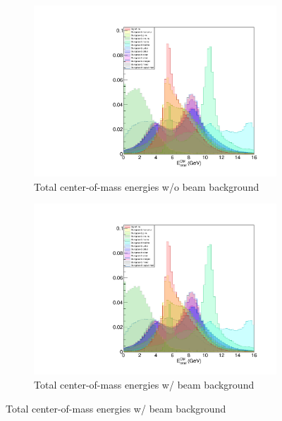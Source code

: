 \documentclass[12pt]{thesis}  %
\begin{document}
   \begin{figure}[h]
        \centering
        \begin{subfigure}[b]{0.475\textwidth}
            \centering
            \includegraphics[width=\textwidth]{images/test.pdf}
            \caption[Network2]%
            {{\small Total center-of-mass energies w/o beam background}}    
            \label{fig:mean and std of net14}
        \end{subfigure}
        \hfill
        \begin{subfigure}[b]{0.475\textwidth}  
            \centering 
            \includegraphics[width=\textwidth]{images/test.pdf}
            \caption[]%
            {{\small Total center-of-mass energies w/ beam background}}    
            \label{fig:mean and std of net24}
        \end{subfigure}
    \end{figure}
    
\end{document}
